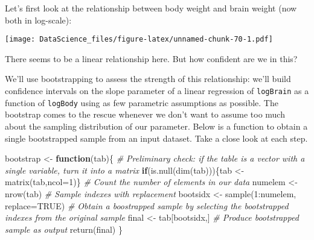\documentclass[
]{book}
\newenvironment{Shaded}{\begin{snugshade}}{\end{snugshade}}
\newcommand{\AttributeTok}[1]{\textcolor[rgb]{0.77,0.63,0.00}{#1}}
\newcommand{\CommentTok}[1]{\textcolor[rgb]{0.56,0.35,0.01}{\textit{#1}}}
\newcommand{\ConstantTok}[1]{\textcolor[rgb]{0.00,0.00,0.00}{#1}}
\newcommand{\ControlFlowTok}[1]{\textcolor[rgb]{0.13,0.29,0.53}{\textbf{#1}}}
\newcommand{\DecValTok}[1]{\textcolor[rgb]{0.00,0.00,0.81}{#1}}
\newcommand{\FunctionTok}[1]{\textcolor[rgb]{0.00,0.00,0.00}{#1}}
\newcommand{\NormalTok}[1]{#1}
\newcommand{\OtherTok}[1]{\textcolor[rgb]{0.56,0.35,0.01}{#1}}
\newcommand{\SpecialCharTok}[1]{\textcolor[rgb]{0.00,0.00,0.00}{#1}}
\begin{document}
Let's first look at the relationship between body weight and brain weight (now both in log-scale):

\begin{Shaded}
\end{Shaded}

\texttt{[image: DataScience\_files/figure-latex/unnamed-chunk-70-1.pdf]}

There seems to be a linear relationship here. But how confident are we in this?

We'll use bootstrapping to assess the strength of this relationship: we'll build confidence intervals on the slope parameter of a linear regression of \texttt{logBrain} as a function of \texttt{logBody} using as few parametric assumptions as possible. The bootstrap comes to the rescue whenever we don't want to assume too much about the sampling distribution of our parameter. Below is a function to obtain a single bootstrapped sample from an input dataset. Take a close look at each step.

\begin{Shaded}
\begin{Highlighting}[]
\NormalTok{bootstrap }\OtherTok{\textless{}{-}} \ControlFlowTok{function}\NormalTok{(tab)\{}
  \CommentTok{\# Preliminary check: if the table is a vector with a single variable, turn it into a matrix}
  \ControlFlowTok{if}\NormalTok{(}\FunctionTok{is.null}\NormalTok{(}\FunctionTok{dim}\NormalTok{(tab)))\{tab }\OtherTok{\textless{}{-}} \FunctionTok{matrix}\NormalTok{(tab,}\AttributeTok{ncol=}\DecValTok{1}\NormalTok{)\}}
  \CommentTok{\# Count the number of elements in our data}
\NormalTok{  numelem }\OtherTok{\textless{}{-}} \FunctionTok{nrow}\NormalTok{(tab)}
  \CommentTok{\# Sample indexes with replacement}
\NormalTok{  bootsidx }\OtherTok{\textless{}{-}} \FunctionTok{sample}\NormalTok{(}\DecValTok{1}\SpecialCharTok{:}\NormalTok{numelem, }\AttributeTok{replace=}\ConstantTok{TRUE}\NormalTok{)}
  \CommentTok{\# Obtain a boostrapped sample by selecting the bootstrapped indexes from the original sample}
\NormalTok{  final }\OtherTok{\textless{}{-}}\NormalTok{ tab[bootsidx,]}
  \CommentTok{\# Produce bootstrapped sample as output}
  \FunctionTok{return}\NormalTok{(final)}
\NormalTok{\}}
\end{Highlighting}
\end{Shaded}
\end{document}
